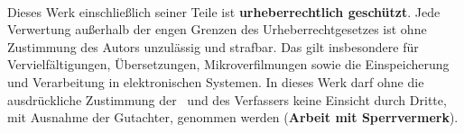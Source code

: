 \begin{titlepage}
\begin{center}
        \textcopyright\ \year\\[1.5ex]
    \end{center}
    
    \singlespacing
    \small
    \noindent Dieses Werk einschließlich seiner Teile ist \textbf{urheberrechtlich geschützt}. Jede Verwertung außerhalb der engen Grenzen des Urheberrechtgesetzes ist ohne Zustimmung des Autors unzulässig und strafbar. Das gilt insbesondere für Vervielfältigungen, Übersetzungen, Mikroverfilmungen sowie die Einspeicherung und Verarbeitung in elektronischen Systemen. In dieses Werk darf ohne die ausdrückliche Zustimmung der \companyname\ und des Verfassers keine Einsicht durch Dritte, mit Ausnahme der Gutachter, genommen werden (\textbf{Arbeit mit Sperrvermerk}).
    
\end{titlepage}
